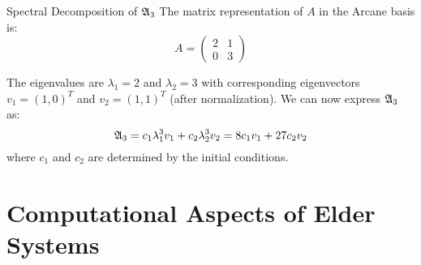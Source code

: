 \begin{twocolumnlayout}
\begin{examplebox}{Spectral Decomposition of $\mathfrak{A}_{3}$}{}
The matrix representation of $A$ in the Arcane basis is:
\begin{equation}
A = \begin{pmatrix}
2 & 1 \\
0 & 3
\end{pmatrix}
\end{equation}

The eigenvalues are $\lambda_1 = 2$ and $\lambda_2 = 3$ with corresponding eigenvectors $v_1 = (1, 0)^T$ and $v_2 = (1, 1)^T$ (after normalization). We can now express $\mathfrak{A}_{3}$ as:
\begin{equation}
\mathfrak{A}_{3} = c_1 \lambda_1^3 v_1 + c_2 \lambda_2^3 v_2 = 8c_1 v_1 + 27c_2 v_2
\end{equation}
where $c_1$ and $c_2$ are determined by the initial conditions.
\end{examplebox}

\end{twocolumnlayout}

\section{Computational Aspects of Elder Systems}

